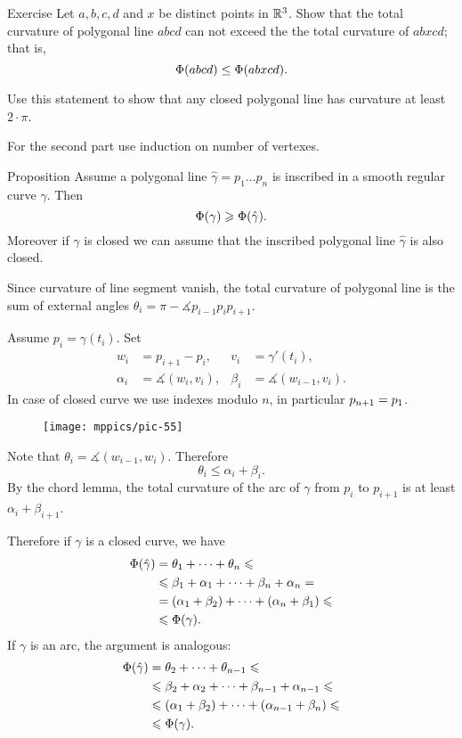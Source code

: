\begin{thm}{Exercise}\label{ex:monotonic-tc}
Let $a,b,c,d$ and $x$ be distinct points in $\mathbb{R}^3$.
Show that the total curvature of polygonal line $abcd$ can not exceed the the total curvature of $abxcd$; that is, 
\[\Phi({abcd}) \leq \Phi({abxcd}).\]

Use this statement to show that any closed polygonal line has curvature at least $2\cdot\pi$.
\end{thm}

 For the second part use induction on number of vertexes.

\begin{thm}{Proposition}\label{prop:inscribed-total-curvature}
Assume a polygonal line $\hat\gamma=p_1\dots p_n$ is inscribed in a smooth regular curve $\gamma$.
Then 
\[\Phi({\gamma})\geqslant \Phi({\hat\gamma}).\]
Moreover if $\gamma$ is closed we can assume that the inscribed polygonal line $\hat\gamma$ is also closed.

\end{thm}

Since curvature of line segment vanish, 
the total curvature of polygonal line is the sum of external angles $\theta_i=\pi-\measuredangle p_{i-1}p_ip_{i+1}$.

Assume $p_i=\gamma(t_i)$.
Set 
\begin{align*}
w_i&=p_{i+1}-p_i,& v_i&=\gamma'(t_i),
\\
\alpha_i&=\measuredangle (w_i,v_i),&\beta_i&=\measuredangle (w_{i-1},v_i).
\end{align*}
In case of closed curve we use indexes modulo $n$, in particular $p_{n+1}\z=p_1$.

\begin{wrapfigure}{r}{40 mm}
\vskip-0mm
\centering
\texttt{[image: mppics/pic-55]}
\vskip0mm
\end{wrapfigure}

Note that $\theta_i=\measuredangle (w_{i-1},w_i)$.
Therefore 
\[\theta_i\le \alpha_i+\beta_i.\]
By the chord lemma, the total curvature of the arc of $\gamma$ from $p_i$ to $p_{i+1}$ is at least $\alpha_i+\beta_{i+1}$. 

Therefore if $\gamma$ is a closed curve, we have
\begin{align*}
\Phi({\hat\gamma})&=\theta_1+\dots+\theta_n\leqslant 
\\
&\leqslant\beta_1+\alpha_1+\dots+\beta_n+\alpha_n = 
\\
&=(\alpha_1+\beta_2)+\dots+(\alpha_n+\beta_1) \leqslant 
\\
&\leqslant \Phi({\gamma}).
\end{align*}
If $\gamma$ is an arc, the argument is analogous:
\begin{align*}
\Phi({\hat\gamma})&=\theta_2+\dots+\theta_{n-1}\leqslant 
\\
&\leqslant\beta_2+\alpha_2+\dots+\beta_{n-1}+\alpha_{n-1} \leqslant
\\
&\leqslant (\alpha_1+\beta_2)+\dots+(\alpha_{n-1}+\beta_n) \leqslant 
\\
&\leqslant \Phi({\gamma}).
\end{align*}
\qedsf

